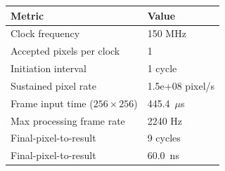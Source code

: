 \begin{tabular}{ll}
\hline
Metric & Value \\
\hline
Clock frequency & 150 MHz \\
Accepted pixels per clock & 1 \\
Initiation interval & 1 cycle \\
Sustained pixel rate & 1.5e+08 pixel/s \\
Frame input time ($256\times256$) & 445.4~$\mu$s \\
Max processing frame rate & 2240 Hz \\
Final-pixel-to-result & 9 cycles \\
Final-pixel-to-result & 60.0~ns \\
\hline
\end{tabular}

